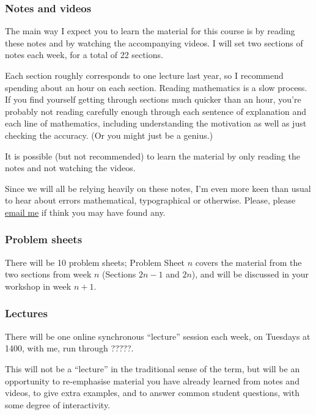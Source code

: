 \documentclass[
  a4paper,
]{article}
\theoremstyle{definition}
\theoremstyle{definition}
\theoremstyle{definition}
\theoremstyle{remark}
\begin{document}
\hypertarget{notes}{%
\subsubsection*{Notes and videos}\label{notes}}

The main way I expect you to learn the material for this course is by reading these notes and by watching the accompanying videos. I will set two sections of notes each week, for a total of 22 sections.

Each section roughly corresponds to one lecture last year, so I recommend spending about an hour on each section. Reading mathematics is a slow process. If you find yourself getting through sections much quicker than an hour, you're probably not reading carefully enough through each sentence of explanation and each line of mathematics, including understanding the motivation as well as just checking the accuracy. (Or you might just be a genius.)

It is possible (but not recommended) to learn the material by only reading the notes and not watching the videos.

Since we will all be relying heavily on these notes, I'm even more keen than usual to hear about errors mathematical, typographical or otherwise. Please, please \href{mailto:m.aldridge@leeds.ac.uk}{email me} if think you may have found any.

\hypertarget{problem-sheets}{%
\subsubsection*{Problem sheets}\label{problem-sheets}}

There will be 10 problem sheets; Problem Sheet \(n\) covers the material from the two sections from week \(n\) (Sections \(2n -1\) and \(2n\)), and will be discussed in your workshop in week \(n+1\).

\hypertarget{lectures}{%
\subsubsection*{Lectures}\label{lectures}}

There will be one online synchronous ``lecture'' session each week, on Tuesdays at 1400, with me, run through ?????.

This will not be a ``lecture'' in the traditional sense of the term, but will be an opportunity to re-emphasise material you have already learned from notes and videos, to give extra examples, and to answer common student questions, with some degree of interactivity.
\end{document}
